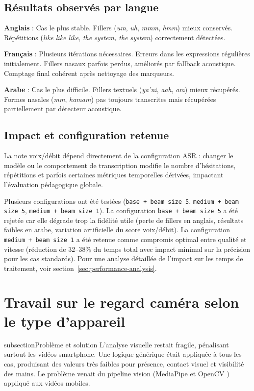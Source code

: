 ﻿\documentclass[12pt,a4paper]{article}
\begin{document}
\subsection{Résultats observés par langue}
\textbf{Anglais} : Cas le plus stable. Fillers (\textit{um}, \textit{uh}, \textit{mmm}, \textit{hmm}) mieux conservés. Répétitions (\textit{like like like}, \textit{the system, the system}) correctement détectées.

\textbf{Français} : Plusieurs itérations nécessaires. Erreurs dans les expressions régulières initialement. Fillers nasaux parfois perdus, améliorés par fallback acoustique. Comptage final cohérent après nettoyage des marqueurs.

\textbf{Arabe} : Cas le plus difficile. Fillers textuels (\textit{ya'ni}, \textit{aah}, \textit{am}) mieux récupérés. Formes nasales (\textit{mm}, \textit{hamam}) pas toujours transcrites mais récupérées partiellement par détecteur acoustique.

\subsection{Impact et configuration retenue}
La note voix/débit dépend directement de la configuration ASR : changer le modèle ou le comportement de transcription modifie le nombre d'hésitations, répétitions et parfois certaines métriques temporelles dérivées, impactant l'évaluation pédagogique globale.

Plusieurs configurations ont été testées (\texttt{base + beam size 5}, \texttt{medium + beam size 5}, \texttt{medium + beam size 1}). La configuration \texttt{base + beam size 5} a été rejetée car elle dégrade trop la fidélité utile (perte de fillers en anglais, résultats faibles en arabe, variation artificielle du score voix/débit). La configuration \texttt{medium + beam size 1} a été retenue comme compromis optimal entre qualité et vitesse (réduction de 32--38\% du temps total avec impact minimal sur la précision pour les cas standards). Pour une analyse détaillée de l'impact sur les temps de traitement, voir section~\ref{sec:performance-analysis}.

\section{Travail sur le regard caméra selon le type d'appareil}

subsection{Problème et solution}
L'analyse visuelle restait fragile, pénalisant surtout les vidéos smartphone. Une logique générique était appliquée à tous les cas, produisant des valeurs très faibles pour présence, contact visuel et visibilité des mains. Le problème venait du pipeline vision (MediaPipe et OpenCV \cite{mediapipe2023,opencv_library}) appliqué aux vidéos mobiles.
\end{document}
